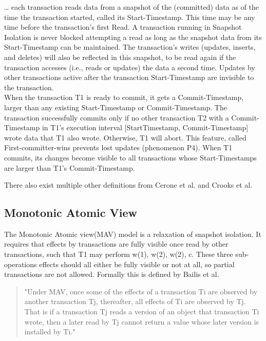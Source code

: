 \documentclass[a4paper,10pt,titlepage]{report}
\begin{document}
\begin{displayquote}
… each transaction reads data from a snapshot of the (committed) data as of the time the transaction started, called its Start-Timestamp. This time may be any time before the transaction's first Read. A transaction running in Snapshot Isolation is never blocked attempting a read as long as the snapshot data from its Start-Timestamp can be maintained. The transaction's writes (updates, inserts, and deletes) will also be reflected in this snapshot, to be read again if the transaction accesses (i.e., reads or updates) the data a second time. Updates by other transactions active after the transaction Start-Timestamp are invisible to the transaction.
\\
When the transaction T1 is ready to commit, it gets a Commit-Timestamp, larger than any existing Start-Timestamp or Commit-Timestamp. The transaction successfully commits only if no other transaction T2 with a Commit-Timestamp in T1's execution interval [StartTimestamp, Commit-Timestamp] wrote data that T1 also wrote. Otherwise, T1 will abort. This feature, called First-committer-wins prevents lost updates (phenomenon P4). When T1 commits, its changes become visible to all transactions whose Start-Timestamps are larger than T1's Commit-Timestamp.
\end{displayquote}

There also exist multiple other definitions from Cerone et al. \cite{CeroneBernardiGotsman} and Crooks et al. \cite{CrooksPuAlvisiClement}

\vspace{2mm}

\vspace{2mm}

\newpage
\subsection{Monotonic Atomic View}
The Monotonic Atomic view(MAV) model is a relaxation of snapshot isolation. It requires that effects by transactions are fully visible once read by other transactions, such that T1 may perform w(1), w(2), w(2), c. These three sub-operations effects should all either be fully visible or not at all, so partial transactions are not allowed. Formally this is defined by Bailis et al. \cite{HighlyAvailableTransactionsVirtuesandLimitations}
\begin{quote}
    "Under MAV, once some of the effects of a transaction Ti are observed by another transaction Tj, thereafter, all effects of Ti are observed by Tj. That is if a transaction Tj reads a version of an object that transaction Ti wrote, then a later read by Tj cannot return a value whose later version is installed by Ti."
\end{quote}
\end{document}
